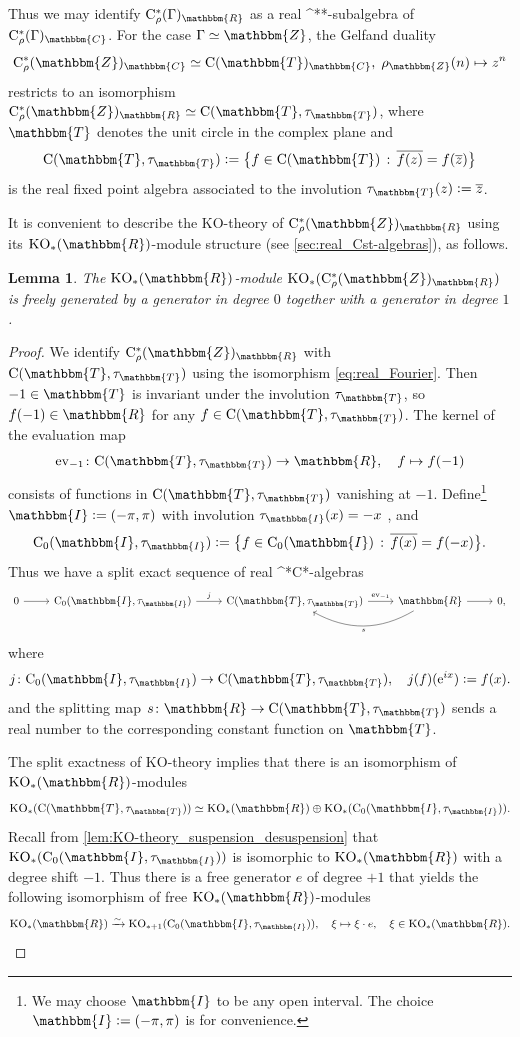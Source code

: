 \documentclass{amsart}
\numberwithin{figure}{section}
\numberwithin{equation}{section}
\numberwithin{table}{section}
\theoremstyle{plain}
\newtheorem{lemma}[equation]{Lemma}
\theoremstyle{definition}
\theoremstyle{remark}
\theoremstyle{nonumber}
\newcommand{\Z}{\mathbb{Z}}
\newcommand{\R}{\mathbb{R}}
\newcommand{\C}{\mathbb{C}}
\newcommand{\T}{\mathbb{T}}
\newcommand{\I}{\mathbb{I}} %
\newcommand{\KO}{\relax\ifmmode\operatorname{KO}\else\textup{KO}\fi}
\newcommand{\st}{\relax\ifmmode{}^*\else{}\textup{*}\fi}
\newcommand{\Cst}{\relax\ifmmode\mathrm{C}^*\else\textup{C*}\fi}
\newcommand{\Cont}{\mathrm{C}}
\newcommand{\Co}{\mathrm{C}_0}
\newcommand{\Cstr}{\Cst_\rho} %
\newcommand{\ev}{\operatorname{ev}} %
\newcommand{\defeq}{\mathrel{\vcentcolon=}}
\renewcommand{\mathbb}{\mathbbm} %
\begin{document}
Thus we may identify \( \Cstr(\Gamma)_\R \) as a real \st-subalgebra of \(
\Cstr(\Gamma)_\C\). For the case \( \Gamma\simeq\Z \), the Gelfand duality
\begin{equation}\label{eq:real_Fourier}
    \Cstr(\Z)_\C\simeq\Cont(\T)_\C,\; \rho_\Z(n)\mapsto z^n
\end{equation}
restricts to an isomorphism \( \Cstr(\Z)_\R\simeq\Cont(\T,\tau_\T) \),
where \( \T \) denotes the unit circle in the complex plane and
\[
\Cont(\T,\tau_\T)\defeq\big\{f\in\Cont(\T)\,:\,\overline{f(z)}=f(\overline{z})\big\}
\]
is the real fixed point algebra associated to the involution \(
\tau_\T(z)\defeq
\overline{z} \). 


It is convenient to describe the KO-theory of \( \Cstr(\Z)_\R \) using
its \( \KO_*(\R) \)-module structure (see \cref{sec:real_Cst-algebras}), as
follows.

\begin{lemma} \label{lem:KO_Z_generators}
The \( \KO_*(\R) \)-module \( \KO_*( \Cstr(\Z)_\R) \) is
freely generated by a generator in
degree \( 0 \) together with a generator in degree \( 1 \).
\end{lemma}

\begin{proof}
We identify \( \Cstr(\Z)_\R \) with \( \Cont(\T,\tau_\T) \) using the
isomorphism \eqref{eq:real_Fourier}.
Then \( -1\in\T \) is invariant under the involution \(
\tau_{\T} \), so \( f(-1)\in\R \) for any \(
f\in\Cont(\T,\tau_\T) \). The kernel of the evaluation map
\[ 
  \ev_{-1}\colon \Cont(\T,\tau_\T)\to\R,\quad f\mapsto f(-1)
\]
consists of functions in \( \Cont(\T,\tau_\T) \) vanishing at \( -1 \).
Define\footnote{We may choose \( \I \) to be any open interval. The choice
\( \I\defeq (-\pi,\pi) \) is for convenience.} \( \I\defeq (-\pi,\pi) \)
with involution \( \tau_{\I}(x)=-x \) , and 
\[
\Co(\I,\tau_\I)\defeq\big\{f\in\Co(\I)\,:\,\overline{f(x)}=f(-x)\big\}.
\]
Thus we have a split exact sequence of real \Cst-algebras
\[
\begin{tikzcd}
0 \arrow[r]  &\Co(\I,\tau_\I) \arrow[r, "j"] & \Cont(\T,\tau_\T) 
\arrow[r,"\ev_{-1}"] & \R \arrow[r] \arrow[l, bend left, "s"]  & 0,
\end{tikzcd}
\]
where
\[
j\colon\Co(\I,\tau_\I)\to\Cont(\mathbb{T},\tau_\mathbb{T}),\quad
  j(f)(\mathrm{e}^{ix})\defeq f(x).
\]
and the splitting map \( s\colon \R\to\Cont(\T,\tau_\T) \) sends a real
number to the corresponding constant function on \( \T \).

The split exactness of KO-theory implies that there is 
an isomorphism of \( \KO_*(\R) \)-modules
\[
  \KO_*(\Cont(\T,\tau_\T))\simeq\KO_*(\R)\oplus\KO_*(\Co(\I,\tau_\I)).
\]
Recall from \cref{lem:KO-theory_suspension_desuspension} that 
\( \KO_*(\Co(\I,\tau_\I)) \) is isomorphic
to \( \KO_*(\R) \) with a degree shift \( -1 \). 
Thus there is a free
generator \( e \) of degree \( +1 \) that yields the following 
isomorphism of free \( \KO_*(\R) \)-modules
\[
  \KO_*(\R)\xrightarrow{\sim}\KO_{*+1}(\Co(\I,\tau_\I)),\quad
  \xi\mapsto \xi\cdot e,\quad \xi\in\KO_*(\R).\qedhere
\]
\end{proof}
\end{document}
